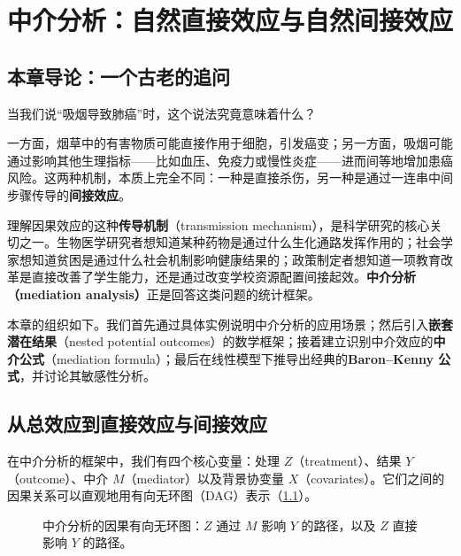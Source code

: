 
\chapter{中介分析：自然直接效应与自然间接效应}
\label{ch:mediation}

\section{本章导论：一个古老的追问}

当我们说``吸烟导致肺癌''时，这个说法究竟意味着什么？

一方面，烟草中的有害物质可能直接作用于细胞，引发癌变；另一方面，吸烟可能通过影响其他生理指标——比如血压、免疫力或慢性炎症——进而间等地增加患癌风险。这两种机制，本质上完全不同：一种是直接杀伤，另一种是通过一连串中间步骤传导的\textbf{间接效应}。

理解因果效应的这种\textbf{传导机制}（transmission mechanism），是科学研究的核心关切之一。生物医学研究者想知道某种药物是通过什么生化通路发挥作用的；社会学家想知道贫困是通过什么社会机制影响健康结果的；政策制定者想知道一项教育改革是直接改善了学生能力，还是通过改变学校资源配置间接起效。\textbf{中介分析（mediation analysis）}正是回答这类问题的统计框架。

本章的组织如下。我们首先通过具体实例说明中介分析的应用场景；然后引入\textbf{嵌套潜在结果}（nested potential outcomes）的数学框架；接着建立识别中介效应的\textbf{中介公式}（mediation formula）；最后在线性模型下推导出经典的\textbf{Baron--Kenny 公式}，并讨论其敏感性分析。

\section{从总效应到直接效应与间接效应}

在中介分析的框架中，我们有四个核心变量：处理 $Z$（treatment）、结果 $Y$（outcome）、中介 $M$（mediator）以及背景协变量 $X$（covariates）。它们之间的因果关系可以直观地用有向无环图（DAG）表示（\cref{fg:mediation-dag}）。

\begin{figure}[ht]
\centering
\begin{xy}
\end{xy}
\caption{中介分析的因果有向无环图：$Z$ 通过 $M$ 影响 $Y$ 的路径，以及 $Z$ 直接影响 $Y$ 的路径。}
\label{fg:mediation-dag}
\end{figure}

